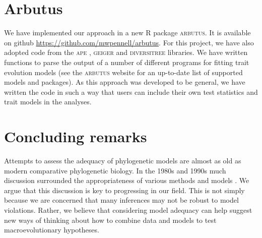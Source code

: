 \section{Arbutus}

We have implemented our approach in a new R package \textsc{arbutus}. It is available on github \url{https://github.com/mwpennell/arbutus}. For this project, we have also adopted code from the \textsc{ape} \citep{ape}, \textsc{geiger} \citep{geiger2} and \textsc{diversitree} \citep{FitzJohn2012} libraries. We have written functions to parse the output of a number of different programs for fitting trait evolution models (see the \textsc{arbutus} website for an up-to-date list of supported models and packages). As this approach was developed to be general, we have written the code in such a way that users can include their own test statistics and trait models in the analyses.

\section{Concluding remarks}
Attempts to assess the adequacy of phylogenetic models are almost as old as modern comparative phylogenetic biology. In the 1980s and 1990s much discussion surrounded the appropriateness of various methods and models \citep{Felsenstein1985, Felsenstein1988, HarveyPagel1991, Garland1992, Diaz1996, Price1997, Garland1999, GarlandIves2000}. We argue that this discussion is key to progressing in our field. This is not simply because we are concerned that many inferences may not be robust to model violations. Rather, we believe that considering model adequacy can help suggest new ways of thinking about how to combine data and models to test macroevolutionary hypotheses.
